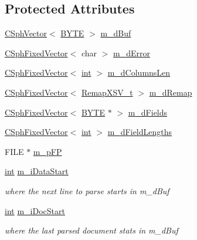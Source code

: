 \subsection*{Protected Attributes}
\begin{DoxyCompactItemize}
\item 
\hyperlink{classCSphVector}{C\-Sph\-Vector}$<$ \hyperlink{sphinxstd_8h_a4ae1dab0fb4b072a66584546209e7d58}{B\-Y\-T\-E} $>$ \hyperlink{classCSphSource__BaseSV_a6be6e6e470f707c9c43d4123282bb904}{m\-\_\-d\-Buf}
\item 
\hyperlink{classCSphFixedVector}{C\-Sph\-Fixed\-Vector}$<$ char $>$ \hyperlink{classCSphSource__BaseSV_ac63e0c03a6de3ff69712b739359d7493}{m\-\_\-d\-Error}
\item 
\hyperlink{classCSphFixedVector}{C\-Sph\-Fixed\-Vector}$<$ \hyperlink{sphinxexpr_8cpp_a4a26e8f9cb8b736e0c4cbf4d16de985e}{int} $>$ \hyperlink{classCSphSource__BaseSV_a24d2092a696b76ce6e390cbb0e3cf93a}{m\-\_\-d\-Columns\-Len}
\item 
\hyperlink{classCSphFixedVector}{C\-Sph\-Fixed\-Vector}$<$ \hyperlink{structRemapXSV__t}{Remap\-X\-S\-V\-\_\-t} $>$ \hyperlink{classCSphSource__BaseSV_ab39d4c46b897debdc6a59c1fe200545c}{m\-\_\-d\-Remap}
\item 
\hyperlink{classCSphFixedVector}{C\-Sph\-Fixed\-Vector}$<$ \hyperlink{sphinxstd_8h_a4ae1dab0fb4b072a66584546209e7d58}{B\-Y\-T\-E} $\ast$ $>$ \hyperlink{classCSphSource__BaseSV_ac6131a6232f2f063c3fc69b598101e72}{m\-\_\-d\-Fields}
\item 
\hyperlink{classCSphFixedVector}{C\-Sph\-Fixed\-Vector}$<$ \hyperlink{sphinxexpr_8cpp_a4a26e8f9cb8b736e0c4cbf4d16de985e}{int} $>$ \hyperlink{classCSphSource__BaseSV_af185adf11b2464d3b4ec339e0e4d6be4}{m\-\_\-d\-Field\-Lengths}
\item 
F\-I\-L\-E $\ast$ \hyperlink{classCSphSource__BaseSV_a66f169fd368952457057b5bd0aa0c373}{m\-\_\-p\-F\-P}
\item 
\hyperlink{sphinxexpr_8cpp_a4a26e8f9cb8b736e0c4cbf4d16de985e}{int} \hyperlink{classCSphSource__BaseSV_ae4d10220733d93f60cb9cd33d9ac9fab}{m\-\_\-i\-Data\-Start}
\begin{DoxyCompactList}\small\item\em where the next line to parse starts in m\-\_\-d\-Buf \end{DoxyCompactList}\item 
\hyperlink{sphinxexpr_8cpp_a4a26e8f9cb8b736e0c4cbf4d16de985e}{int} \hyperlink{classCSphSource__BaseSV_a223e0b723cd89cb7ff7f0f70164b52a1}{m\-\_\-i\-Doc\-Start}
\begin{DoxyCompactList}\small\item\em where the last parsed document stats in m\-\_\-d\-Buf \end{DoxyCompactList}\item 

\end{DoxyCompactItemize}
